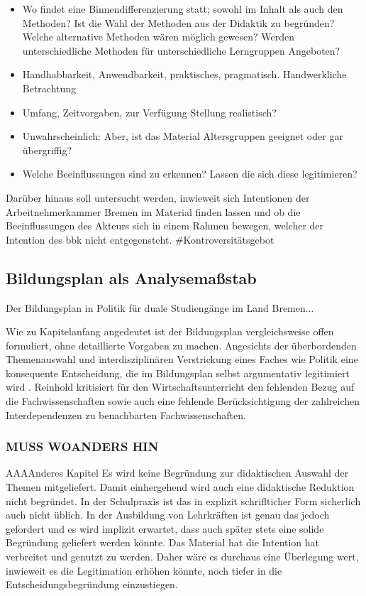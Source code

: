 \begin{itemize}
    \item Wo findet eine Binnendifferenzierung statt; sowohl im Inhalt als auch den Methoden? Ist die Wahl der Methoden aus der Didaktik zu begründen? Welche alternative Methoden wären möglich gewesen? Werden unterschiedliche Methoden für unterschiedliche Lerngruppen Angeboten?
    \item Handhabbarkeit, Anwendbarkeit, praktisches, pragmatisch. Handwerkliche Betrachtung
    \item Umfang, Zeitvorgaben, zur Verfügung Stellung realistisch?
    \item Unwahrscheinlich: Aber, ist das Material Altersgruppen geeignet oder gar übergriffig?
    \item Welche Beeinflussungen sind zu erkennen? Lassen die sich diese legitimieren?
\end{itemize}
Darüber hinaus soll untersucht werden, inwieweit sich Intentionen der Arbeitnehmerkammer Bremen im Material finden lassen und ob die Beeinflussungen des Akteurs sich in einem Rahmen bewegen, welcher der Intention des \gls{bbk} nicht entgegensteht. \#Kontroversitätsgebot 


\subsection{Bildungsplan als Analysemaßstab}
Der Bildungsplan \autocite{bplan} in Politik für duale Studiengänge im Land Bremen...

Wie zu Kapitelanfang angedeutet ist der Bildungsplan vergleichsweise offen formuliert, ohne detaillierte Vorgaben zu machen. Angesichts der überbordenden Themenauswahl und interdisziplinären Verstrickung eines Faches wie Politik eine konsequente Entscheidung, die im Bildungsplan selbst argumentativ legitimiert wird \autocite[diggah, welche Seite habe ich das gelesen]{bplan}. Reinhold \textcite[17-18]{Hedtke2016} kritisiert für den Wirtschaftsunterricht den fehlenden Bezug auf die Fachwissenschaften sowie auch eine fehlende Berücksichtigung der zahlreichen Interdependenzen zu benachbarten Fachwissenschaften. 


\subsubsection{MUSS WOANDERS HIN}
AAAAnderes Kapitel
Es wird keine Begründung zur didaktischen Auswahl der Themen mitgeliefert. Damit einhergehend wird auch eine didaktische Reduktion nicht begründet. In der Schulpraxis ist das in explizit schriflticher Form sicherlich auch nicht üblich. In der Ausbildung von Lehrkräften ist genau das jedoch gefordert und es wird implizit erwartet, dass auch später stets eine solide Begründung geliefert werden könnte.
Das Material hat die Intention hat verbreitet und genutzt zu werden. Daher wäre es durchaus eine Überlegung wert, inwieweit es die Legitimation  erhöhen könnte, noch tiefer in die Entscheidungsbegründung einzustiegen.


